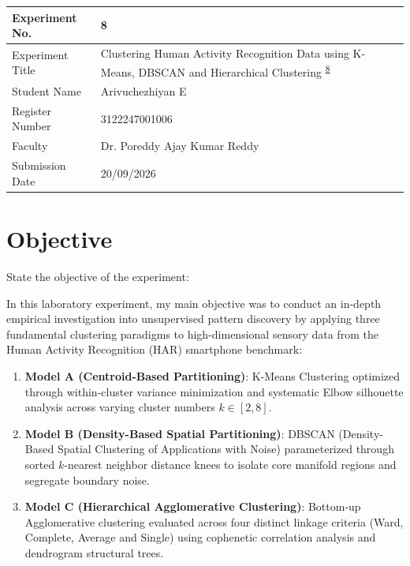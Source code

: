 \documentclass[12pt,a4paper]{article}
\begin{document}

\begin{tabular}{|p{4cm}|p{11cm}|}
\hline
Experiment No. & 8 \\ \hline
Experiment Title & Clustering Human Activity Recognition Data using K-Means, DBSCAN and Hierarchical Clustering \textsuperscript{\href{https://github.com/arivuchezhiyan/Machine_Learning/tree/main/experiment_8}{8}} \\ \hline
Student Name & Arivuchezhiyan E \\ \hline
Register Number & 3122247001006 \\ \hline
Faculty & Dr. Poreddy Ajay Kumar Reddy \\ \hline
Submission Date & 20/09/2026 \\ \hline
\end{tabular}

\vspace{0.5cm}

\section{Objective}
State the objective of the experiment:

In this laboratory experiment, my main objective was to conduct an in-depth empirical investigation into unsupervised pattern discovery by applying three fundamental clustering paradigms to high-dimensional sensory data from the Human Activity Recognition (HAR) smartphone benchmark:
\begin{enumerate}
\item \textbf{Model A (Centroid-Based Partitioning)}: K-Means Clustering optimized through within-cluster variance minimization and systematic Elbow silhouette analysis across varying cluster numbers $k \in [2, 8]$.
\item \textbf{Model B (Density-Based Spatial Partitioning)}: DBSCAN (Density-Based Spatial Clustering of Applications with Noise) parameterized through sorted $k$-nearest neighbor distance knees to isolate core manifold regions and segregate boundary noise.
\item \textbf{Model C (Hierarchical Agglomerative Clustering)}: Bottom-up Agglomerative clustering evaluated across four distinct linkage criteria (Ward, Complete, Average and Single) using cophenetic correlation analysis and dendrogram structural trees.
\end{enumerate}
\end{document}
